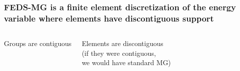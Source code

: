 \documentclass[compress,10pt]{beamer}
\newlength \figwidth
\begin{document}
\begin{frame}
   \frametitle{FEDS-MG is a finite element discretization of the energy variable where elements have discontiguous support}

\setlength {}

\centering
\vspace{-1mm}
\vspace{7mm}

\begin{columns}[t]


   \setlength {}

   \centering

   \vspace{3mm}

   \vspace{2mm}
   {\footnotesize
   Groups are contiguous
   }


   \setlength {}

   \centering

   \vspace{3mm}

   \vspace{2mm}
   {\footnotesize
       Elements are discontiguous \\
   }
   { \scriptsize
       (if they were contiguous, \\
       \vspace{-1.8mm}
       we would have standard MG)
   }

   \end{columns}

\end{frame}
\end{document}
